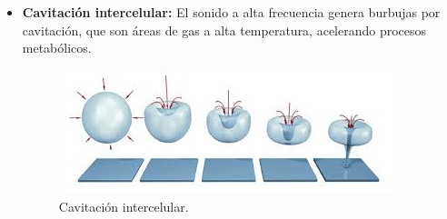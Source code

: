 \documentclass[twocolumn]{article}
\begin{document}
\begin{itemize}
    \item \textbf{Cavitación intercelular:} El sonido a alta frecuencia genera burbujas por cavitación, que son áreas de gas a alta temperatura, acelerando procesos metabólicos.
    \begin{figure}[!h]
        \centering
        \includegraphics[width=\linewidth]{imagenes/images.jpeg}
        \caption{Cavitación intercelular.}
    \end{figure}
\end{itemize}
\end{document}
